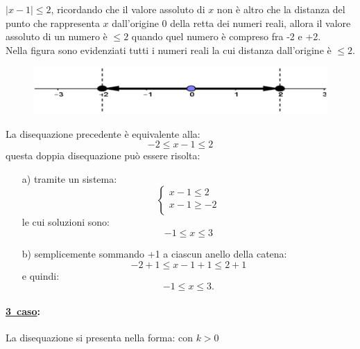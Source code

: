\begin{esempio}  $|x-1|\leq 2$, ricordando che il valore 
assoluto di $x$ non è altro che la distanza del punto che rappresenta 
$x$ dall'origine 0 della retta dei numeri reali, allora il valore assoluto di 
un 
numero è $\leq 2$ quando quel numero è compreso fra -2 e +2.\\
        Nella figura sono evidenziati tutti i numeri reali la cui distanza 
dall'origine è $\leq 2$.

\begin{figure}[h]
\begin{center}
\begin{inaccessibleblock}[TODO]
\centering
\includegraphics[width=0.5\linewidth]{img/imm4} %
\end{inaccessibleblock}
\label{fig:abs_imm4}
\end{center}
\end{figure}

La disequazione precedente è equivalente alla:
$$-2\leq x-1 \leq 2$$
questa doppia disequazione può essere risolta:
\begin{enumerate}
  \item [a)] tramite un sistema:
    $$
    \left\lbrace 
    \begin{array}{l}
    x-1\leq 2\\
    x-1\geq -2\\
    \end{array}
    \right.
    $$
    le cui soluzioni sono:
    $$-1\leq x \leq 3$$
  \item [b)] semplicemente sommando +1 a ciascun anello della catena:
    $$-2+1\leq x-1+1 \leq 2+1$$
    e quindi:
    $$-1\leq x \leq 3.$$
\end{enumerate}
\end{esempio}

\paragraph{\underline{3\textdegree~caso}:} La disequazione si presenta nella forma:  
 con $k> 0$\\

